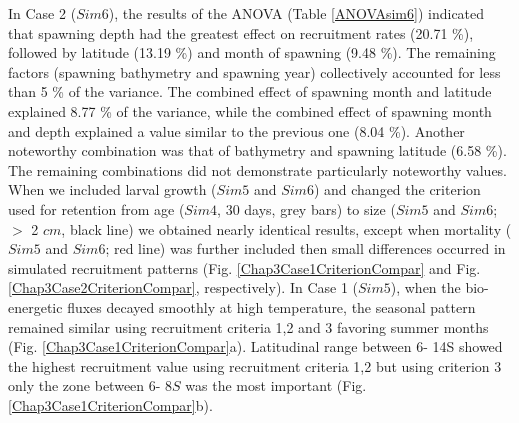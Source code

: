 In Case 2 ($Sim 6$), the results of the ANOVA (Table \ref{ANOVAsim6}) indicated that spawning depth had the greatest effect on recruitment rates (20.71 \%), followed by latitude (13.19 \%) and month of spawning (9.48 \%). The remaining factors (spawning bathymetry and spawning year) collectively accounted for less than 5 \% of the variance. The combined effect of spawning month and latitude explained 8.77 \% of the variance, while the combined effect of spawning month and depth explained a value similar to the previous one (8.04 \%). Another noteworthy combination was that of bathymetry and spawning latitude (6.58 \%). The remaining combinations did not demonstrate particularly noteworthy values.\\

When we included larval growth ($Sim 5$ and $Sim 6$) and changed the criterion used for retention from age ($Sim 4$, 30 days, grey bars) to size ($Sim 5$ and $Sim 6$; $>$ 2 $cm$, black line) we obtained nearly identical results, except when mortality ($Sim 5$ and $Sim 6$; red line) was further included then small differences occurred in simulated recruitment patterns (Fig. \ref{Chap3Case1CriterionCompar} and Fig. \ref{Chap3Case2CriterionCompar}, respectively). In Case 1 ($Sim 5$), when the bio-energetic fluxes decayed smoothly at high temperature, the seasonal pattern remained similar using recruitment criteria 1,2 and 3 favoring summer months (Fig. \ref{Chap3Case1CriterionCompar}a). Latitudinal range between 6\textdegree - 14\textdegree S showed the highest recruitment value using recruitment criteria 1,2 but using criterion 3 only the zone between 6\textdegree - 8\textdegree $S$ was the most important (Fig. \ref{Chap3Case1CriterionCompar}b).\\

